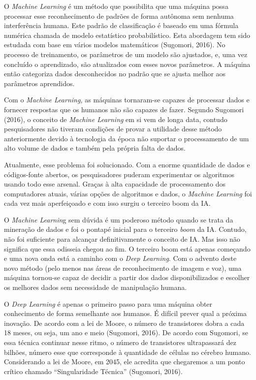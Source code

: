 O \emph{Machine Learning} é um método que possibilita que uma máquina
possa processar esse reconhecimento de padrões de forma autônoma sem
nenhuma interferência humana. Este padrão de classificação é baseado em
uma fórmula numérica chamada de modelo estatístico probabilístico. Esta
abordagem tem sido estudada com base em vários modelos matemáticos
(Sugomori, 2016). No processo de treinamento, os parâmetros de um modelo
são ajustados, e, uma vez concluído o aprendizado, são atualizados com
esses novos parâmetros. A máquina então categoriza dados desconhecidos
no padrão que se ajusta melhor aos parâmetros aprendidos.

Com o \emph{Machine Learning,} as máquinas tornaram-se capazes de
processar dados e fornecer respostas que os humanos não são capazes de
fazer. Segundo Sugomori (2016), o conceito de \emph{Machine Learning} em
si vem de longa data, contudo pesquisadores não tiveram condições de
provar a utilidade desse método anteriormente devido à tecnologia da
época não suportar o processamento de um alto volume de dados e também
pela própria falta de dados.

Atualmente, esse problema foi solucionado. Com a enorme quantidade de
dados e códigos-fonte abertos, os pesquisadores puderam experimentar os
algoritmos usando todo esse arsenal. Graças à alta capacidade de
processamento dos computadores atuais, várias opções de algoritmos e
dados, o \emph{Machine Learning} foi cada vez mais aperfeiçoado e com
isso surgiu o terceiro boom da IA.

O \emph{Machine Learnin}g sem dúvida é um poderoso método quando se
trata da mineração de dados e foi o pontapé inicial para o terceiro
\emph{boom} da IA. Contudo, não foi suficiente para alcançar
definitivamente o conceito de IA. Mas isso não significa que essa
odisseia chegou ao fim. O terceiro boom está apenas começando e uma nova
onda está a caminho com o \emph{Deep Learning}. Com o advento deste novo
método (pelo menos nas áreas de reconhecimento de imagem e voz), uma
máquina tornou-se capaz de decidir a partir dos dados disponibilizados e
escolher os melhores dados sem necessidade de manipulação humana.

O \emph{Deep Learning} é apenas o primeiro passo para uma máquina obter
conhecimento de forma semelhante aos humanos. É difícil prever qual a
próxima inovação. De acordo com a lei de Moore, o número de transistores
dobra a cada 18 meses, ou seja, um ano e meio (Sugomori, 2016). De
acordo com Sugomori, se essa técnica continuar nesse ritmo, o número de
transistores ultrapassará dez bilhões, número esse que corresponde à
quantidade de células no cérebro humano. Considerando a lei de Moore, em
2045, ele acredita que chegaremos a um ponto crítico chamado
``Singularidade Técnica'' (Sugomori, 2016).

